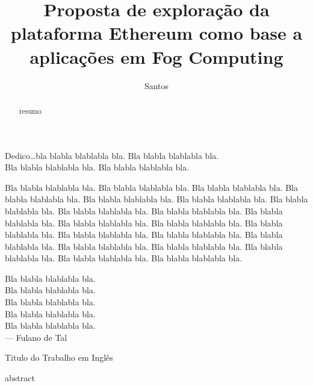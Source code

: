 \documentclass[tcc,capa]{texufpel}
\title{Proposta de exploração da plataforma Ethereum como base a aplicações em Fog Computing}
\author{Santos}{Gustavo Fernandes dos}
\begin{document}
\renewcommand{\advisorname}{Orientadora}           %

\newcommand{\bchain}{\textit{blockchain}}
\newcommand{\Bchain}{\textit{Blockchain}}

\maketitle 

\sloppy

\fichacatalografica

\folhadeaprovacao

\begin{dedicatoria}
  Dedico\ldots bla blabla blablabla bla. Bla blabla blablabla bla.\\
  Bla blabla blablabla bla. Bla blabla blablabla bla.
\end{dedicatoria}

\begin{agradecimentos}
  Bla blabla blablabla bla.  Bla blabla blablabla bla.  Bla blabla blablabla
  bla.  Bla blabla blablabla bla.  Bla blabla blablabla bla.  Bla blabla
  blablabla bla.  Bla blabla blablabla bla.  Bla blabla blablabla bla.  Bla
  blabla blablabla bla.  Bla blabla blablabla bla.  Bla blabla blablabla bla.
  Bla blabla blablabla bla.  Bla blabla blablabla bla.  Bla blabla blablabla
  bla.  Bla blabla blablabla bla.  Bla blabla blablabla bla.  Bla blabla
  blablabla bla.  Bla blabla blablabla bla.  Bla blabla blablabla bla.  Bla
  blabla blablabla bla.  Bla blabla blablabla bla.
\end{agradecimentos}

\begin{epigrafe}
  Bla blabla blablabla bla.\\
  Bla blabla blablabla bla.\\
  Bla blabla blablabla bla.\\
  Bla blabla blablabla bla.\\
  Bla blabla blablabla bla.\\
  {\sc --- Fulano de Tal}
\end{epigrafe}

\begin{abstract}
  resumo
\end{abstract}

\begin{englishabstract}%
  {Titulo do Trabalho em Inglês}
  
	abstract
\end{englishabstract}
\end{document}
